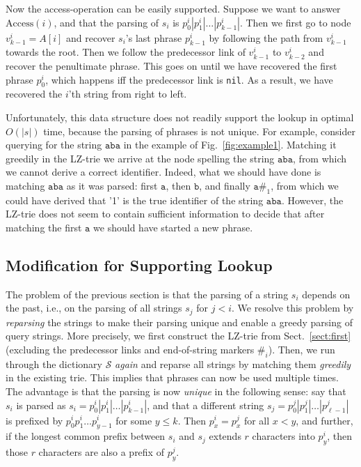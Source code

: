 \documentclass{llncs}
\newcommand{\strings}{\ensuremath{\mathcal{S}}}
\newcommand{\access}{\ensuremath{\text{Access}}}
\newcommand{\str}[1]{\ensuremath{\texttt{#1}}}
\begin{document}
Now the access-operation can be easily supported. Suppose we want to answer $\access(i)$, and that the parsing of $s_i$ is $p^i_0|p^i_1|\dots |p^i_{k-1}|$. Then we first go to node $v^i_{k-1}=A[i]$ and recover $s_i$'s last phrase $p^i_{k-1}$ by following the path from $v^i_{k-1}$ towards the root.
Then we follow the predecessor link of $v^i_{k-1}$ to $v^i_{k-2}$ and recover the penultimate phrase. This goes on until we have recovered the first phrase $p^i_0$, which happens iff the predecessor link is \texttt{nil}. As a result, we have recovered the $i$'th string from right to left.

Unfortunately, this data structure does not readily support the lookup in optimal $O(|s|)$ time, because the parsing of phrases is not unique. For example, consider querying for the string \str{aba} in the example of Fig.\ \ref{fig:example1}. Matching it greedily in the LZ-trie we arrive at the node spelling the string \str{aba}, from which we cannot derive a correct identifier. Indeed, what we should have done is matching \str{aba} as it was parsed: first \str{a}, then \str{b}, and finally $\str{a}\#_1$, from which we could have derived that '1' is the true identifier of the string \str{aba}. However, the LZ-trie does not seem to contain sufficient information to decide that after matching the first \str{a} we should have started a new phrase.

\subsection{Modification for Supporting Lookup}
\label{sect:second}
The problem of the previous section is that the parsing of a string $s_i$ depends on the past, i.e., on the parsing of all strings $s_j$ for $j<i$.
We resolve this problem by \emph{reparsing} the strings to make their parsing unique and enable a greedy parsing of query strings. More precisely, we first construct the LZ-trie from Sect.~\ref{sect:first} (excluding the predecessor links and end-of-string markers $\#_i$). Then, we run through the dictionary $\strings$ \emph{again} and reparse all strings by matching them \emph{greedily} in the existing trie. This implies that phrases can now be used multiple times. The advantage is that the parsing is now \emph{unique} in the following sense: say that $s_i$ is parsed as $s_i=p^i_0|p^i_1|\dots |p^i_{k-1}|$, and that a different string $s_j=p^j_0|p^j_1|\dots |p^j_{\ell-1}|$ is prefixed by $p^i_0p^i_1\dots p^i_{y-1}$ for some $y\le k$. Then $p^i_x = p^j_x$ for all $x<y$, and further, if the longest common prefix between $s_i$ and $s_j$ extends $r$ characters into $p^i_y$, then those $r$ characters are also a prefix of $p^j_y$.
\end{document}
